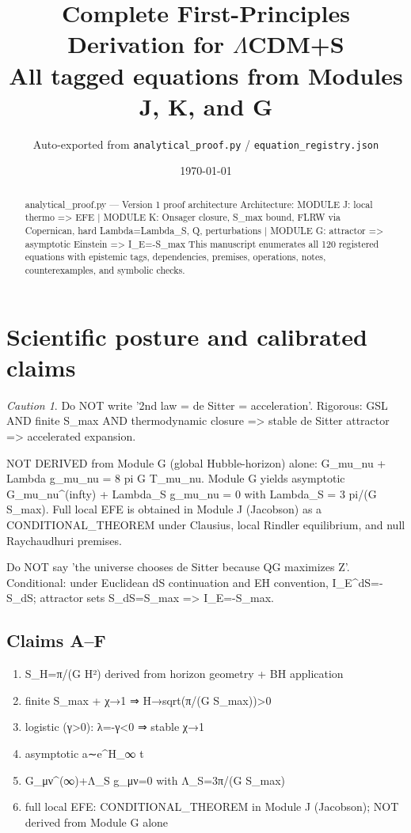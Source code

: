 \documentclass[11pt,a4paper]{article}
\title{Complete First-Principles Derivation for $\Lambda$CDM+S\\[0.3em]\large All tagged equations from Modules J, K, and G}
\author{Auto-exported from \texttt{analytical\_proof.py} / \texttt{equation\_registry.json}}
\date{\today}
\theoremstyle{remark}\newtheorem*{caution}{Caution}
\begin{document}
\maketitle
\begin{abstract}
analytical\_proof.py — Version 1 proof architecture Architecture: MODULE J: local thermo => EFE | MODULE K: Onsager closure, S\_max bound, FLRW via Copernican, hard Lambda=Lambda\_S, Q, perturbations | MODULE G: attractor => asymptotic Einstein => I\_E=-S\_max This manuscript enumerates all 120 registered equations with epistemic tags, dependencies, premises, operations, notes, counterexamples, and symbolic checks.
\end{abstract}
\tableofcontents\newpage
\section{Scientific posture and calibrated claims}
\begin{caution}
Do NOT write '2nd law = de Sitter = acceleration'. Rigorous: GSL AND finite S\_max AND thermodynamic closure => stable de Sitter attractor => accelerated expansion.
\par\vspace{0.5em}
NOT DERIVED from Module G (global Hubble-horizon) alone: G\_mu\_nu + Lambda g\_mu\_nu = 8 pi G T\_mu\_nu. Module G yields asymptotic G\_mu\_nu^(infty) + Lambda\_S g\_mu\_nu = 0 with Lambda\_S = 3 pi/(G S\_max). Full local EFE is obtained in Module J (Jacobson) as a CONDITIONAL\_THEOREM under Clausius, local Rindler equilibrium, and null Raychaudhuri premises.
\par\vspace{0.5em}
Do NOT say 'the universe chooses de Sitter because QG maximizes Z'. Conditional: under Euclidean dS continuation and EH convention, I\_E^{dS}=-S\_dS; attractor sets S\_dS=S\_max => I\_E=-S\_max.
\end{caution}
\subsection{Claims A--F}
\begin{enumerate}[label=\textbf{Claim~\Alph*:}]
\item S\_H=π/(G H²) derived from horizon geometry + BH application
\item finite S\_max + χ→1 ⇒ H→sqrt(π/(G S\_max))>0
\item logistic (γ>0): λ=-γ<0 ⇒ stable χ→1
\item asymptotic a∼e^{H\_∞ t}
\item G\_μν^(∞)+Λ\_S g\_μν=0 with Λ\_S=3π/(G S\_max)
\item full local EFE: CONDITIONAL\_THEOREM in Module J (Jacobson); NOT derived from Module G alone
\end{enumerate}
\end{document}
